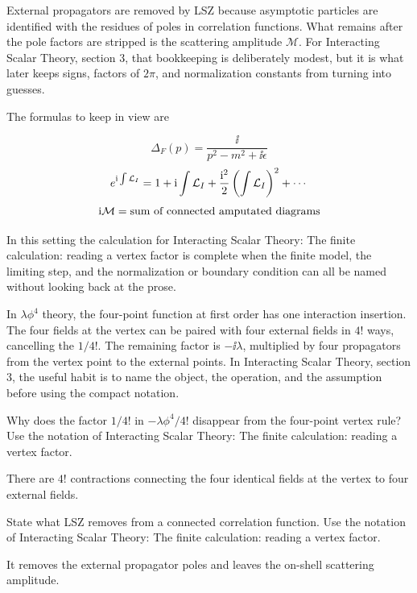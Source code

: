 External propagators are removed by LSZ because asymptotic particles are identified with the residues of poles in correlation functions.  What remains after the pole factors are stripped is the scattering amplitude \(\mathcal M\).  For Interacting Scalar Theory, section 3, that bookkeeping is deliberately modest, but it is what later keeps signs, factors of \(2\pi\), and normalization constants from turning into guesses.

The formulas to keep in view are

\[
  \Delta_F(p)=\frac{\ii}{p^2-m^2+\ii\epsilon}
\]
\[
  e^{\mathrm i\int\mathcal L_I}=1+\mathrm i\int\mathcal L_I+\frac{\mathrm i^2}{2}\left(\int\mathcal L_I\right)^2+\cdots
\]
\[
  \mathrm i\mathcal M=\hbox{sum of connected amputated diagrams}
\]

In this setting the calculation for Interacting Scalar Theory: The finite calculation: reading a vertex factor is complete when the finite model, the limiting step, and the normalization or boundary condition can all be named without looking back at the prose.




\begin{example}
In \(\lambda\phi^4\) theory, the four-point function at first order has one interaction insertion.  The four fields at the vertex can be paired with four external fields in \(4!\) ways, cancelling the \(1/4!\).  The remaining factor is \(-\ii\lambda\), multiplied by four propagators from the vertex point to the external points.  In Interacting Scalar Theory, section 3, the useful habit is to name the object, the operation, and the assumption before using the compact notation.
\end{example}



\begin{exercise}
Why does the factor \(1/4!\) in \(-\lambda\phi^4/4!\) disappear from the four-point vertex rule?  Use the notation of Interacting Scalar Theory: The finite calculation: reading a vertex factor.
\begin{answer}
There are \(4!\) contractions connecting the four identical fields at the vertex to four external fields.
\end{answer}
\end{exercise}

\begin{exercise}
State what LSZ removes from a connected correlation function.  Use the notation of Interacting Scalar Theory: The finite calculation: reading a vertex factor.
\begin{answer}
It removes the external propagator poles and leaves the on-shell scattering amplitude.
\end{answer}
\end{exercise}




